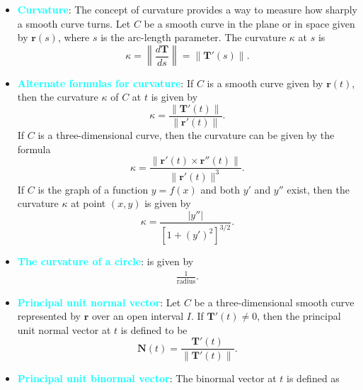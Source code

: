 \documentclass{report}
\begin{document}
\begin{itemize}
        \item \textbf{\textcolor{cyan}{Curvature}}: The concept of curvature provides a way to measure how sharply a smooth curve turns.
            Let $C$ be a smooth curve in the plane or in space given by $\mathbf{r}(s)$, where $s$ is the arc-length parameter. The curvature $\kappa$ at $s$ is
            \begin{equation}
                \kappa = \left\|\frac{d\mathbf{T}}{ds}\right\| = \|\mathbf{T}'(s)\|.
            \end{equation}
        \item \textbf{\textcolor{cyan}{Alternate formulas for curvature}}:
            If $C$ is a smooth curve given by $\mathbf{r}(t)$, then the curvature $\kappa$ of $C$ at $t$ is given by
            \begin{equation}
                \kappa = \frac{\|\mathbf{T}'(t)\|}{\|\mathbf{r}'(t)\|}.
            \end{equation}
            If $C$ is a three-dimensional curve, then the curvature can be given by the formula
            \begin{equation}
                \kappa = \frac{\|\mathbf{r}'(t) \times \mathbf{r}''(t)\|}{\|\mathbf{r}'(t)\|^3}.
            \end{equation}
            If $C$ is the graph of a function $y=f(x)$ and both $y'$ and $y''$ exist, then the curvature $\kappa$ at point $(x,y)$ is given by
            \begin{equation}
                \kappa = \frac{|y''|}{[1+(y')^2]^{3/2}}.
            \end{equation}
        \item \textbf{\textcolor{cyan}{The curvature of a circle}}: is given by 
            \begin{align*}
                \frac{1}{\text{radius}}
            .\end{align*}
        \item \textbf{\textcolor{cyan}{Principal unit normal vector}}:
            Let $C$ be a three-dimensional smooth curve represented by $\mathbf{r}$ over an open interval $I$. If $\mathbf{T}'(t) \neq 0$, then the principal unit normal vector at $t$ is defined to be
            \begin{equation}
                \mathbf{N}(t) = \frac{\mathbf{T}'(t)}{\|\mathbf{T}'(t)\|}.
            \end{equation}
        \item \textbf{\textcolor{cyan}{Principal unit binormal vector}}:
            The binormal vector at $t$ is defined as

\end{itemize}
\end{document}
